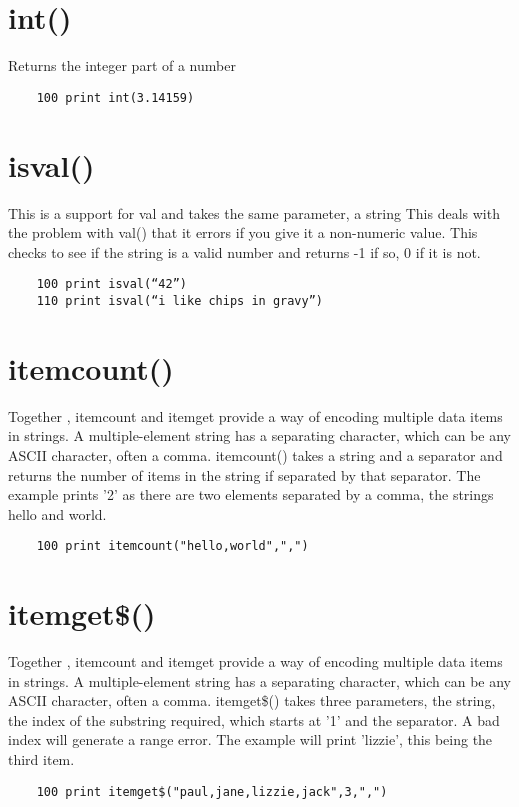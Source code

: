 \section*{int()}
Returns the integer part of a number
\example{}
\begin{verbatim}
	100 print int(3.14159)
\end{verbatim}

\section*{isval()}
This is a support for val and takes the same parameter, a string  This deals with the problem with val() that it errors if you give it a non-numeric value. This checks to see if the string is a valid number  and returns -1 if so, 0 if it is not.
\example{}
\begin{verbatim}
	100 print isval(“42”)
	110 print isval(“i like chips in gravy”)
\end{verbatim}

\section*{itemcount()}
Together , itemcount and itemget provide a way of encoding multiple data items in strings. A multiple-element string has a separating character, which can be any ASCII character, often a comma. 
itemcount() takes a string and a separator and returns the number of items in the string if separated by that separator. The example prints '2' as there are two elements separated by a comma, the strings hello and world.
\example{}
\begin{verbatim}
	100 print itemcount("hello,world",",")
\end{verbatim}

\section*{itemget\$()}
Together , itemcount and itemget provide a way of encoding multiple data items in strings. A multiple-element string has a separating character, which can be any ASCII character, often a comma.  itemget\$() takes three parameters, the string, the index of the substring required, which starts at '1' and the separator. A bad index will generate a range error.
The example will print 'lizzie', this being the third item.
\example{}
\begin{verbatim}
	100 print itemget$("paul,jane,lizzie,jack",3,",")
\end{verbatim}


